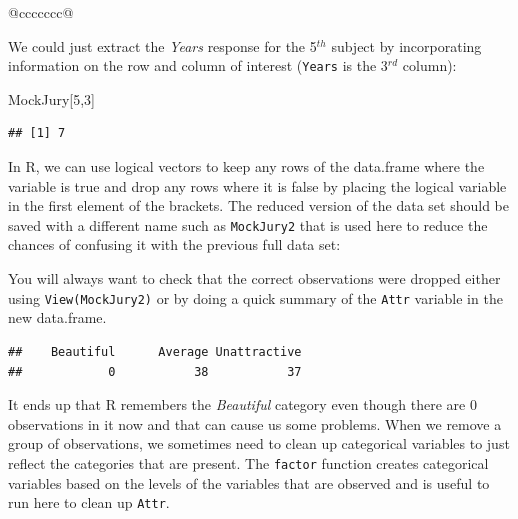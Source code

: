\documentclass[]{book}
\newenvironment{Shaded}{\begin{snugshade}}{\end{snugshade}}
\newcommand{\KeywordTok}[1]{\textcolor[rgb]{0.13,0.29,0.53}{\textbf{#1}}}
\newcommand{\DecValTok}[1]{\textcolor[rgb]{0.00,0.00,0.81}{#1}}
\newcommand{\StringTok}[1]{\textcolor[rgb]{0.31,0.60,0.02}{#1}}
\newcommand{\OperatorTok}[1]{\textcolor[rgb]{0.81,0.36,0.00}{\textbf{#1}}}
\newcommand{\NormalTok}[1]{#1}
\theoremstyle{definition}
\theoremstyle{definition}
\theoremstyle{remark}
\begin{document}
\begin{longtable}[]{@{}ccccccc@{}}
\begin{minipage}[b]{0.10\columnwidth}
We could just extract the \emph{Years} response for the 5\(^{th}\)
subject by incorporating information on the row and column of interest
(\texttt{Years} is the 3\(^{rd}\) column):

\begin{Shaded}
\begin{Highlighting}[]
\NormalTok{MockJury[}\DecValTok{5}\NormalTok{,}\DecValTok{3}\NormalTok{]}
\end{Highlighting}
\end{Shaded}

\begin{verbatim}
## [1] 7
\end{verbatim}

In R, we can use logical vectors to keep any rows of the data.frame
where the variable is true and drop any rows where it is false by
placing the logical variable in the first element of the brackets. The
reduced version of the data set should be saved with a different name
such as \texttt{MockJury2} that is used here to reduce the chances of
confusing it with the previous full data set:

\begin{Shaded}
\end{Shaded}

You will always want to check that the correct observations were dropped
either using \texttt{View(MockJury2)} or by doing a quick summary of the
\texttt{Attr} variable in the new data.frame.

\begin{Shaded}
\end{Shaded}

\begin{verbatim}
##    Beautiful      Average Unattractive 
##            0           38           37
\end{verbatim}

It ends up that R remembers the \emph{Beautiful} category even though
there are 0 observations in it now and that can cause us some problems.
When we remove a group of observations, we sometimes need to clean up
categorical variables to just reflect the categories that are present.
The \texttt{factor} function creates categorical variables based on the
levels of the variables that are observed and is useful to run here to
clean up \texttt{Attr}.


\end{minipage}
\end{longtable}
\end{document}

